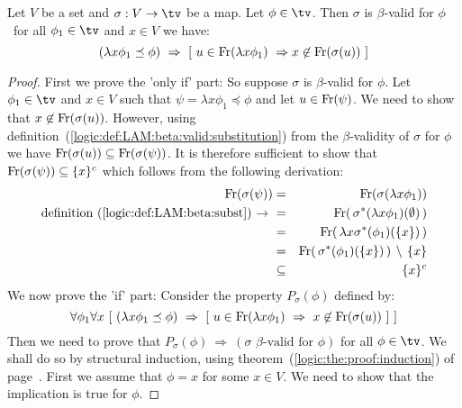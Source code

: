 \begin{prop}\label{logic:prop:LAM:beta:validsub:criterion}
    Let $V$ be a set and $\sigma:V\to\tv$ be a map. Let $\phi\in\tv$.
    Then $\sigma$ is $\beta$-valid for $\phi$ \ifand\ for all $\phi_{1}\in\tv$
    and $x\in V$ we have:
    \[
        (\lambda x\phi_{1}\preceq\phi)\
            \Rightarrow\ 
            [\ 
                u\in\free(\lambda x\phi_{1})\ 
                    \Rightarrow
                x\not\in\free(\sigma(u))
            \ ]
    \]
\end{prop}
\begin{proof}
    First we prove the 'only if' part: So suppose $\sigma$ is $\beta$-valid for
    $\phi$. Let $\phi_{1}\in\tv$ and $x\in V$ such that 
    $\psi=\lambda x\phi_{1}\preceq\phi$ and let $u\in\mbox{\rm Fr}(\psi)$. We need to
    show that $x\not\in\mbox{\rm Fr}(\sigma(u))$. However, using
    definition~(\ref{logic:def:LAM:beta:valid:substitution}) from the
    $\beta$-validity of $\sigma$ for $\phi$ we have 
    $\mbox{\rm Fr}(\sigma(u))\subseteq\mbox{\rm Fr}(\sigma(\psi))$. It is therefore sufficient
    to show that $\mbox{\rm Fr}(\sigma(\psi))\subseteq\{x\}^{c}$ which follows from the
    following derivation:
        \begin{eqnarray*}\free(\sigma(\psi))
            &=&\free(\sigma(\lambda x\phi_{1}))\\
            \mbox{definition~(\ref{logic:def:LAM:beta:subst})\ $\rightarrow$\ }
            &=&\free(\,\sigma^{*}(\lambda x\phi_{1})(\emptyset)\,)\\
            &=&\free(\,\lambda x\sigma^{*}(\phi_{1})(\{x\})\,)\\
            &=&\free(\,\sigma^{*}(\phi_{1})(\{x\})\,)\,\setminus\,\{x\}\\
            &\subseteq&\{x\}^{c}
        \end{eqnarray*}
    We now prove the 'if' part: Consider the property $P_{\sigma}(\phi)$
    defined by:
    \[
        \forall\phi_{1}\forall x\ 
            [\ (\lambda x\phi_{1}\preceq\phi)\ 
                    \Rightarrow\ 
                [\
                    u\in\free(\lambda x\phi_{1})\ 
                        \Rightarrow\
                    x\not\in\free(\sigma(u))
                \ ]
            \ ]
    \]
    Then we need to prove that $P_{\sigma}(\phi)\ \Rightarrow\ (\mbox{$\sigma$
    $\beta$-valid for $\phi$})$ for all $\phi\in\tv$. We shall do so by structural 
    induction, using theorem~(\ref{logic:the:proof:induction}) of
    page~\pageref{logic:the:proof:induction}. First we assume that $\phi=x$
    for some $x\in V$. We need to show that the implication is true for $\phi$.

\end{proof}
